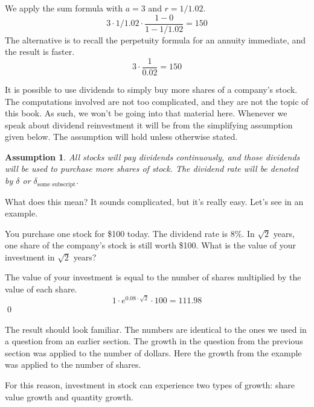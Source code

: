 \documentclass{ximera}
\newtheorem{ass}{Assumption}
\begin{document}
\begin{solution}
We apply the sum formula with $a=3$ and $r=1/1.02$.
	\begin{equation*}
		3\cdot 1/1.02\cdot\frac{1-0}{1-1/1.02}=150
	\end{equation*}
The alternative is to recall the perpetuity formula for an annuity immediate, and the result is faster.
	\begin{equation*}
		3\cdot\frac{1}{0.02}=150
	\end{equation*}
\end{solution}

It is possible to use dividends to simply buy more shares of a company's stock. The computations involved are not too complicated, and they are not the topic of this book. As such, we won't be going into that material here. Whenever we speak about dividend reinvestment it will be from the simplifying assumption given below. The assumption will hold unless otherwise stated.

\begin{ass}
All stocks will pay dividends continuously, and those dividends will be used to purchase more shares of stock. The dividend rate will be denoted by $\delta$ or $\delta_{\text{some subscript}}$.
\end{ass}

What does this mean? It sounds complicated, but it's really easy. Let's see in an example.

\begin{example}
You purchase one stock for \$100 today. The dividend rate is 8\%. In $\sqrt{2}$ years, one share of the company's stock is still worth \$100. What is the value of your investment in $\sqrt{2}$ years?

The value of your investment is equal to the number of shares multiplied by the value of each share.
	\begin{equation*}
		1\cdot e^{0.08\cdot\sqrt{2}}\cdot 100=111.98
	\end{equation*} 
	\qed
\end{example}

The result should look familiar. The numbers are identical to the ones we used in a question from an earlier section. The growth in the question from the previous section was applied to the number of dollars. Here the growth from the example was applied to the number of shares. 

For this reason, investment in stock can experience two types of growth: share value growth and quantity growth. 
\end{document}
